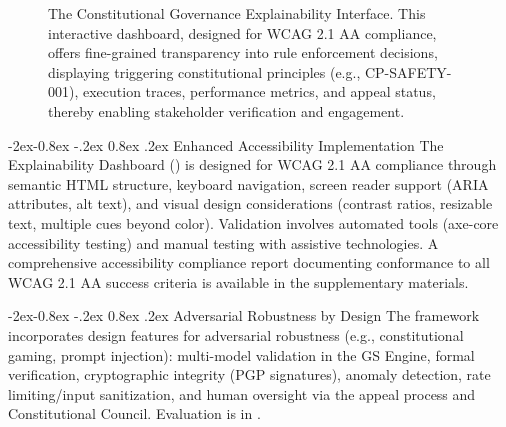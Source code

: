 \documentclass[manuscript,screen,9pt]{acmart}
\makeatletter
\renewcommand\subsubsection{\@startsection{subsubsection}{3}{\z@}%
  {-2ex\@plus -0.8ex \@minus -.2ex}%
  {0.8ex \@plus .2ex}%
  {\normalfont\normalsize\bfseries}}
\makeatother
\begin{document}
\begin{figure}[!htb]
\centering
\caption[Constitutional Governance Explainability Interface]{The Constitutional Governance Explainability Interface. This interactive dashboard, designed for WCAG 2.1 AA compliance, offers fine-grained transparency into rule enforcement decisions, displaying triggering constitutional principles (e.g., CP-SAFETY-001), execution traces, performance metrics, and appeal status, thereby enabling stakeholder verification and engagement.}
\label{fig:explainability_dashboard}
\end{figure}

\subsubsection{Enhanced Accessibility Implementation}
\label{subsubsec:enhanced_accessibility}
The Explainability Dashboard () is designed for WCAG 2.1 AA compliance through semantic HTML structure, keyboard navigation, screen reader support (ARIA attributes, alt text), and visual design considerations (contrast ratios, resizable text, multiple cues beyond color). Validation involves automated tools (axe-core accessibility testing) and manual testing with assistive technologies. A comprehensive accessibility compliance report documenting conformance to all WCAG 2.1 AA success criteria is available in the supplementary materials.

\subsubsection{Adversarial Robustness by Design}
\label{subsubsec:adversarial_robustness_methods}
The framework incorporates design features for adversarial robustness (e.g., constitutional gaming, prompt injection): multi-model validation in the GS Engine, formal verification, cryptographic integrity (PGP signatures), anomaly detection, rate limiting/input sanitization, and human oversight via the appeal process and Constitutional Council. Evaluation is in .
\end{document}
